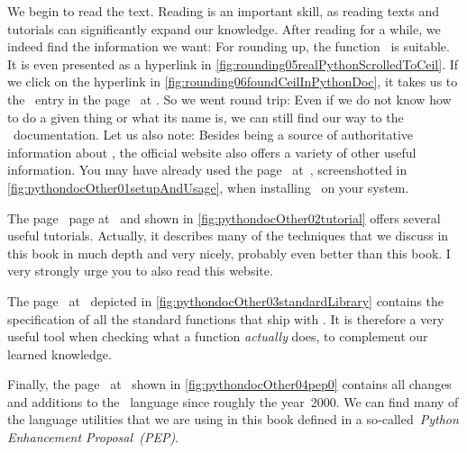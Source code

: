 We begin to read the text.
Reading is an important skill, as reading texts and tutorials can significantly expand our knowledge.
After reading for a while, we indeed find the information we want:
For rounding up, the function~ is suitable.
It is even presented as a hyperlink in \cref{fig:rounding05realPythonScrolledToCeil}.
If we click on the hyperlink in \cref{fig:rounding06foundCeilInPythonDoc}, it takes us to the ~entry in the  page~\cite{PSF:P3D:TPSL:MMF} at .
So we went round trip:
Even if we do not know how to do a given thing or what its name is, we can still find our way to the \python\ documentation.%
%
%
%
Let us also note:
Besides being a source of authoritative information about \python, the official website also offers a variety of other useful information.
You may have already used the  page~\cite{PSF:P3D:PSAU} at~, screenshotted in \cref{fig:pythondocOther01setupAndUsage}, when installing \python\ on your system.

The  page~\cite{PSF:P3D:TPT} page at~ and shown in \cref{fig:pythondocOther02tutorial} offers several useful tutorials.
Actually, it describes many of the techniques that we discuss in this book in much depth and very nicely, probably even better than this book.
I very strongly urge you to also read this website.

The  page~\cite{PSF:P3D:TPSL} at~ depicted in \cref{fig:pythondocOther03standardLibrary} contains the specification of all the standard functions that ship with \python.
It is therefore a very useful tool when checking what a function \emph{actually} does, to complement our learned knowledge.

Finally, the  page~\cite{PEP0} at~ shown in \cref{fig:pythondocOther04pep0} contains all changes and additions to the \python\ language since roughly the year~2000.
We can find many of the language utilities that we are using in this book defined in a so-called~\emph{Python Enhancement Proposal~(PEP)}.%
%
\FloatBarrier%
\global\let\glslink\oldinterludepythonglslink%
\endhsection%
%
